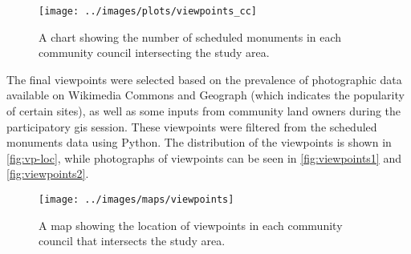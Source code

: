\begin{figure}
  \centering
  \texttt{[image: ../images/plots/viewpoints\_cc]}
  \caption{A chart showing the number of scheduled monuments in each community council intersecting the study area. \label{fig:sm-cc}}
\end{figure}

The final viewpoints were selected based on the prevalence of photographic data available on Wikimedia Commons and Geograph \autocite{wikimedia,geograph-uk} (which indicates the popularity of certain sites), as well as some inputs from community land owners during the participatory \gls{gis} session. These viewpoints were filtered from the scheduled monuments data using Python. The distribution of the viewpoints is shown in \autoref{fig:vp-loc}, while photographs of viewpoints can be seen in \autoref{fig:viewpoints1} and \autoref{fig:viewpoints2}.

\begin{figure}
  \centering
  \texttt{[image: ../images/maps/viewpoints]}
  \caption{A map showing the location of viewpoints in each community council that intersects the study area. \label{fig:vp-loc}}
\end{figure}


